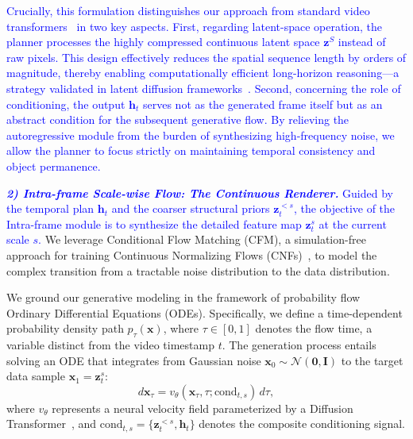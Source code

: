 \textcolor{blue}{Crucially, this formulation distinguishes our approach from standard video transformers~\cite{yan2021videogpt, rakhimov2020latent} in two key aspects. First, regarding latent-space operation, the planner processes the highly compressed continuous latent space $\boldsymbol{z}^S$ instead of raw pixels. This design effectively reduces the spatial sequence length by orders of magnitude, thereby enabling computationally efficient long-horizon reasoning—a strategy validated in latent diffusion frameworks~\cite{rombach2022high}. Second, concerning the role of conditioning, the output $\boldsymbol{h}_t$ serves not as the generated frame itself but as an abstract condition for the subsequent generative flow. By relieving the autoregressive module from the burden of synthesizing high-frequency noise, we allow the planner to focus strictly on maintaining temporal consistency and object permanence.}

\noindent \textcolor{blue}{\textit{\textbf{2) Intra-frame Scale-wise Flow: The Continuous Renderer.}}
Guided by the temporal plan $\boldsymbol{h}_t$ and the coarser structural priors $\boldsymbol{z}_t^{<s}$, the objective of the Intra-frame module is to synthesize the detailed feature map $\boldsymbol{z}_t^s$ at the current scale $s$.} We leverage Conditional Flow Matching (CFM), a simulation-free approach for training Continuous Normalizing Flows (CNFs)~\cite{lipman2023flow, albergo2025stochastic, dao2023flow}, to model the complex transition from a tractable noise distribution to the data distribution.

We ground our generative modeling in the framework of probability flow Ordinary Differential Equations (ODEs). Specifically, we define a time-dependent probability density path $p_\tau(\boldsymbol{x})$, where $\tau \in [0, 1]$ denotes the flow time, a variable distinct from the video timestamp $t$. The generation process entails solving an ODE that integrates from Gaussian noise $\boldsymbol{x}_0 \sim \mathcal{N}(\boldsymbol{0}, \boldsymbol{I})$ to the target data sample $\boldsymbol{x}_1 = \boldsymbol{z}_t^s$:
\begin{equation}
    d\boldsymbol{x}_\tau = v_\theta(\boldsymbol{x}_\tau, \tau; \text{cond}_{t,s}) \, d\tau,
\end{equation}
where $v_\theta$ represents a neural velocity field parameterized by a Diffusion Transformer~\cite{peebles2023scalable, yao2025reconstruction}, and $\text{cond}_{t,s} = \{ \boldsymbol{z}_t^{<s}, \boldsymbol{h}_t \}$ denotes the composite conditioning signal.

